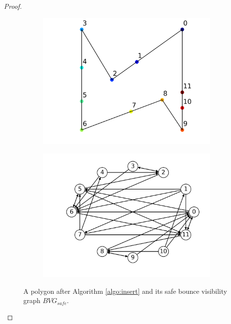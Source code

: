 \documentclass[]{styles/svproc}  %
\begin{document}
\begin{proof}
\begin{figure}
\centering
\begin{subfigure}{0.5\textwidth}
\centering
\includegraphics[width=\linewidth]{figures/simple_bit_inserted.png}
\end{subfigure}%
\begin{subfigure}{0.5\textwidth}
\centering
\includegraphics[width=\linewidth]{figures/simple_bit_safe_graph.png}
\end{subfigure}
\caption{A polygon after Algorithm \ref{algo:insert} and its safe bounce
visibility graph $BVG_{safe}$. }
\label{fig:simple_bit}
\end{figure}


\end{proof}
\end{document}
